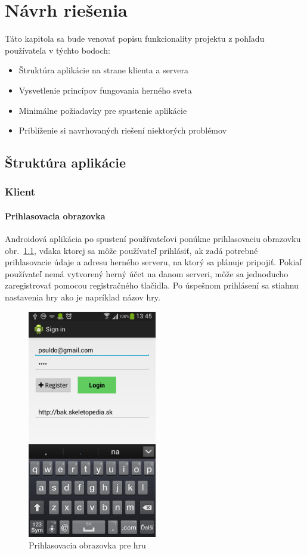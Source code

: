 \chapter{Návrh riešenia}
Táto kapitola sa bude venovať popisu funkcionality projektu z pohľadu používateľa v týchto bodoch:

\begin{itemize}
  \item Štruktúra aplikácie na strane klienta a servera
  \item Vysvetlenie princípov fungovania herného sveta
  \item Minimálne požiadavky pre spustenie aplikácie
  \item Priblíženie si navrhovaných riešení niektorých problémov
\end{itemize}



\section{Štruktúra aplikácie}
\subsection{Klient}
\subsubsection{Prihlasovacia obrazovka}
Androidová aplikácia po spustení používateľovi ponúkne prihlasovaciu obrazovku obr.~\ref{fig:klient_login}, vďaka ktorej sa môže používateľ prihlásiť, ak zadá potrebné prihlasovacie údaje a adresu herného serveru, na ktorý sa plánuje pripojiť. Pokiaľ používateľ nemá vytvorený herný účet na danom serveri, môže sa jednoducho zaregistrovať pomocou registračného tlačidla. Po úspešnom prihlásení sa stiahnu nastavenia hry ako je napríklad názov hry. 
\begin{figure}[h]
  \centering
  \includegraphics[height=10cm]{mainmatter/imgs/klient_login.png}
  \caption{Prihlasovacia obrazovka pre hru}
  \label{fig:klient_login}
\end{figure}
